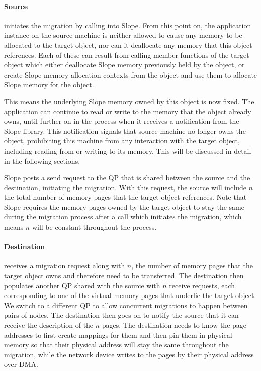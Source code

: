 \paragraph{Source}
initiates the migration by calling into Slope. From this point
on, the application instance on the source machine is neither allowed to
cause any memory to be allocated to the target object, nor can it deallocate any memory that
this object references. Each of these can result from calling member functions
of the target object which either deallocate Slope memory previously held by the
object, or create Slope memory allocation contexts from the object and
use them to allocate Slope memory for the object.

This means the underlying Slope memory owned by this object is now
fixed. The application can continue to read or write to the memory that the
object already owns, until further on in the process when it receives a
notification from the Slope library. This notification signals that source
machine no longer owns the object, prohibiting this machine from any
interaction with the target object, including reading from or writing to its
memory. This will be discussed in detail in the following sections.

Slope posts a send request to the QP that is shared
between the source and the destination, initiating the migration.
With this request, the source will include $n$ the total number of
memory pages that the target object references. Note that Slope requires the
memory pages owned by the target object to stay the same during the migration
process after a call which initiates the migration, which means $n$ will be
constant throughout the process.

\paragraph{Destination}
receives a migration request along with $n$, the number of memory pages that the
target object owns and therefore need to
be transferred. The destination then populates another QP shared with the source
with $n$ receive requests, each corresponding to one of the virtual memory pages
that underlie the target object. We switch to a different QP
to allow concurrent migrations to happen between pairs of nodes. The destination
then goes on to notify the source that it can receive the description of the $n$
pages. The destination needs to know the page addresses
to first create mappings for them and then pin them in physical memory so that their
physical address will stay the same throughout the migration, while the network
device writes to the pages by their physical address over DMA.

